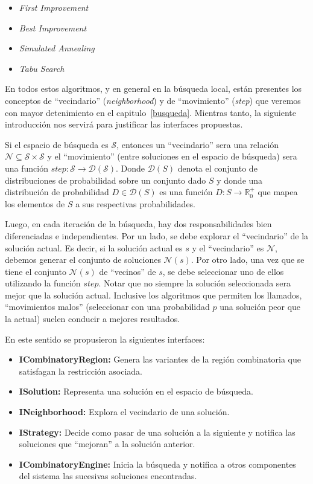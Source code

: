 \begin{itemize}
 \item \textit{First Improvement}
 \item \textit{Best Improvement}
 \item \textit{Simulated Annealing}
 \item \textit{Tabu Search}
\end{itemize}

En todos estos algoritmos, y en general en la b\'usqueda local, est\'an
presentes los conceptos de ``vecindario'' (\textit{neighborhood}) y de
``movimiento'' (\textit{step}) que veremos con mayor detenimiento en el
capitulo~\ref{busqueda}. Mientras tanto, la siguiente introducci\'on nos
servir\'a para justificar las interfaces propuestas.

Si el espacio de b\'usqueda es $\mathcal{S}$, entonces un ``vecindario'' sera
una relaci\'on $\mathcal{N} \subseteq \mathcal{S} \times \mathcal{S}$ y el
``movimiento'' (entre soluciones en el espacio de b\'usqueda) sera una funci\'on
$step: \mathcal{S} \rightarrow \mathcal{D}(\mathcal{S})$. Donde $\mathcal{D}(S)$
denota el conjunto de distribuciones de probabilidad sobre un conjunto dado $S$
y donde una distribuci\'on de probabilidad $D \in \mathcal{D}(S)$ es una
funci\'on $D:S \rightarrow \mathbb{R}^{+}_{0}$ que mapea los elementos de $S$ a
sus respectivas probabilidades.

Luego, en cada iteraci\'on de la b\'usqueda, hay dos responsabilidades bien
diferenciadas e independientes. Por un lado, se debe explorar el ``vecindario''
de la soluci\'on actual. Es decir, si la soluci\'on actual es $s$ y el
``vecindario'' es $\mathcal{N}$, debemos generar el conjunto de soluciones
$\mathcal{N}(s)$. Por otro lado, una vez que se tiene el conjunto
$\mathcal{N}(s)$ de ``vecinos'' de $s$, se debe seleccionar uno de ellos
utilizando la funci\'on $step$. Notar que no siempre la soluci\'on seleccionada
sera mejor que la soluci\'on actual. Inclusive los algoritmos que permiten los
llamados, ``movimientos malos'' (seleccionar con una probabilidad $p$ una
soluci\'on peor que la actual) suelen conducir a mejores resultados.

En este sentido se propusieron la siguientes interfaces:

\begin{itemize}
 \item \textbf{ICombinatoryRegion:} Genera las variantes de la regi\'on
combinatoria que satisfagan la restricci\'on asociada.
 \item \textbf{ISolution:} Representa una soluci\'on en el espacio de
b\'usqueda.
 \item \textbf{INeighborhood:} Explora el vecindario de una soluci\'on.
 \item \textbf{IStrategy:} Decide como pasar de una soluci\'on a la siguiente y
notifica las soluciones que ``mejoran'' a la soluci\'on anterior.
 \item \textbf{ICombinatoryEngine:} Inicia la b\'usqueda y notifica a otros
componentes del sistema las sucesivas soluciones encontradas.
\end{itemize}

